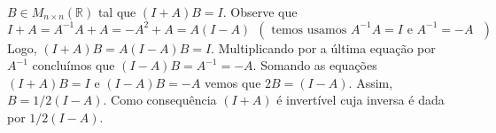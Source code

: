\documentclass[11pt]{exam}
\begin{document}
\begin{questions}
\begin{solution}
\begin{enumerate}
        $B \in M_{n \times n}(\mathbb{R})$ tal que $(I+A)B=I$.
        Observe que 
        $$I+A=A^{-1}A+A=-A^{2}+A=A(I-A) \ \ 
        (\text{ temos usamos $A^{-1}A=I$ e $A^{-1}=-A$ })$$
        Logo, $(I+A)B=A(I-A)B=I$. Multiplicando por a última equação por $A^{-1}$
        concluímos que $(I-A)B=A^{-1}=-A$.
        Somando as equações $(I+A)B=I$ e  $(I-A)B=-A$ vemos que 
        $2B=(I-A)$. Assim, $B=1/2(I-A)$.
        Como consequência $(I+A)$ é invertível cuja inversa é dada por $1/2(I-A)$.
      \end{enumerate}
      \end{solution}
\end{questions}
\end{document}
